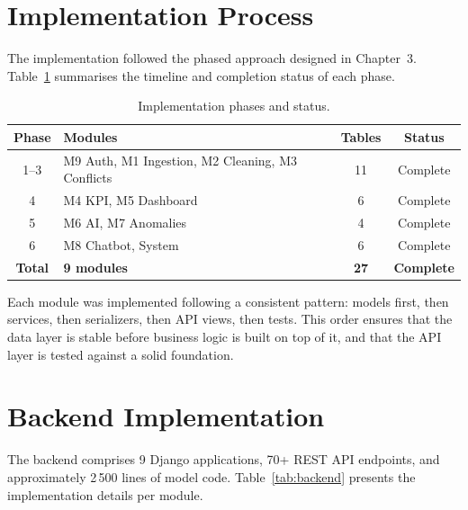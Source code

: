 \section{Implementation Process}

\noindent
The implementation followed the phased approach
designed in Chapter~3.
Table~\ref{tab:phases} summarises the timeline
and completion status of each phase.

\begin{table}[h!]
\centering
\caption{Implementation phases and status.}
\label{tab:phases}
\renewcommand{\arraystretch}{1.3}
\begin{tabular}{|c|l|c|c|}
\hline
\textbf{Phase} & \textbf{Modules} & \textbf{Tables} & \textbf{Status} \\
\hline
1--3 & M9 Auth, M1 Ingestion, M2 Cleaning, M3 Conflicts & 11 & Complete \\
4    & M4 KPI, M5 Dashboard                             & 6  & Complete \\
5    & M6 AI, M7 Anomalies                              & 4  & Complete \\
6    & M8 Chatbot, System                               & 6  & Complete \\
\hline
\textbf{Total} & \textbf{9 modules} & \textbf{27} & \textbf{Complete} \\
\hline
\end{tabular}
\end{table}

\noindent
Each module was implemented following a consistent pattern:
models first, then services, then serializers,
then API views, then tests.
This order ensures that the data layer is stable
before business logic is built on top of it,
and that the API layer is tested against
a solid foundation.


\section{Backend Implementation}

\noindent
The backend comprises 9 Django applications,
70+ REST API endpoints,
and approximately 2\,500 lines of model code.
Table~\ref{tab:backend} presents the implementation
details per module.


